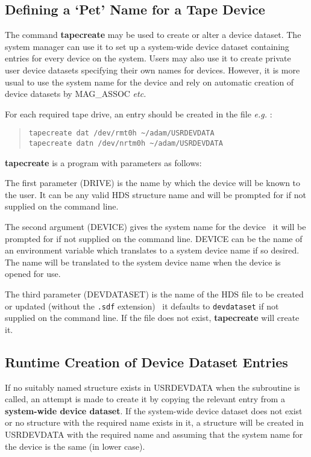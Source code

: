 \subsection{\label{tapecreate}Defining a `Pet' Name for a
Tape Device}
The command {\bf tapecreate} may be used to create or alter a device dataset.
The system manager can use it to set up a system-wide device dataset
containing entries for every device on the system. Users may also use it to
create private user device datasets specifying their own names for devices.
However, it is more usual to use the system name for the device and rely on
automatic creation of device datasets by MAG\_ASSOC {\em etc.}

For each required tape drive, an entry should be created in the file
{\em e.g.} :
\small \begin{quote}
\begin{verbatim}
tapecreate dat /dev/rmt0h ~/adam/USRDEVDATA
tapecreate datn /dev/nrtm0h ~/adam/USRDEVDATA
\end{verbatim}
\end{quote} \normalsize

{\bf tapecreate} is a
program with parameters as follows:

The first parameter (DRIVE) is the name by which the device will be known to
the user. It can be any valid HDS structure name and will be prompted for if
not supplied on the command line.

The second argument (DEVICE) gives the system name for the device \dash\ it
will be prompted for if not supplied on the command line.
DEVICE can be the name of an environment variable which translates to a
system device name if so desired. The name will be translated to the
system device name when the device is opened for use.

The third parameter (DEVDATASET) is the name of the HDS file to be created or
updated (without the {\tt.sdf} extension) \dash\ it defaults to
{\tt devdataset} if not supplied on the command line.
If the file does not exist, {\bf tapecreate} will create it.

\subsection{Runtime Creation of Device Dataset Entries}
If no suitably named structure exists in USRDEVDATA when the
subroutine is called, an attempt is made to create it by copying the relevant
entry from a {\bf system-wide device dataset}.
If the system-wide device dataset does not exist or no structure with the
required name exists in it, a structure will be created in USRDEVDATA with
the required name and assuming that the system name for the device is the same
(in lower case).

